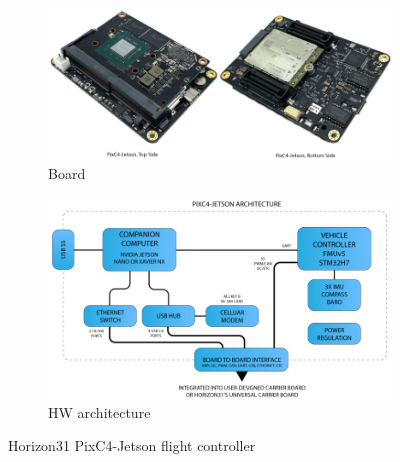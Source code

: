 \begin{figure}[htb!]
  \centering
  \begin{subfigure}[t]{0.9\textwidth}
    \includegraphics[width=1.0\textwidth]{./img/png/hw-horizon-pixc4-jetson.png}
    \caption{Board}
    \label{fig:hw-horizonJetson-board}
  \end{subfigure}

  \begin{subfigure}[t]{0.9\textwidth}
    \includegraphics[width=1.0\textwidth]{./img/png/hw-horizon-pixc4-jetson-arch.png}
    \caption{HW architecture}
    \label{fig:hw-horizonJetson-arch}
  \end{subfigure}

  \caption[Horizon31 PixC4-Jetson flight controller]{Horizon31 PixC4-Jetson flight controller~\cite{arduPilot-horizonJetson}\footnotemark}
  \label{fig:hw-horizonJetson}
\end{figure}
%


